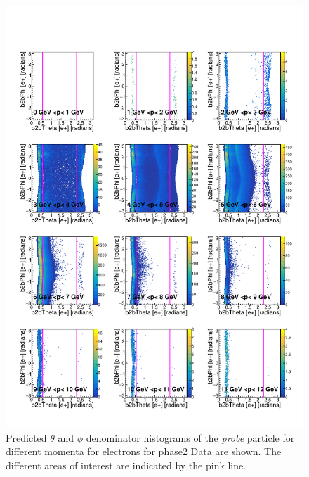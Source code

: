 \documentclass[a4paper,11pt,twosided,final,german,openbib,pdftex,listof=totoc,bibliography=totoc]{scrbook}
\begin{document}
\begin{appendix}
\begin{figure}[h!]
	\includegraphics[width=\textwidth]{Plots/RTPMemD_Data.pdf}
	\caption[Denominator $\theta$-$\phi$ Electron Momentum Phase2 Data]{Predicted $\theta$ and $\phi$ denominator histograms of the \textit{probe} particle for different momenta for electrons for phase2 Data are shown. The different areas of interest are indicated by the pink line.}
	\label{plt:RTPMemD_Data}
\end{figure}






\end{appendix}
\end{document}
